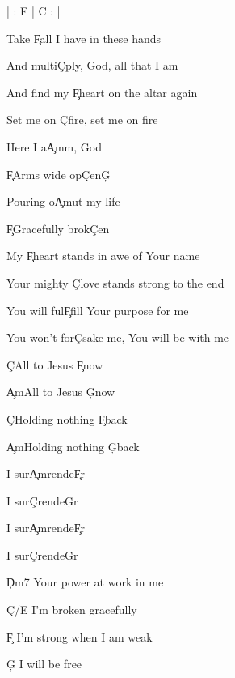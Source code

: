 \documentclass[9pt]{extarticle}
\begin{document}
\bsong

\bi
| : F | C : |
\ei

\bv[2]
Take \c{F}all I have in these hands

And multi\c{C}ply, God, all that I am

And find my \c{F}heart on the altar again

Set me on \c{C}fire, set me on fire
\ev

\bc
Here I a\c{Am}m, God

\c{F}Arms wide op\c{C}en\c{G}

Pouring o\c{Am}ut my life

\c{F}Gracefully brok\c{C}en
\ec

\bv
My \c{F}heart stands in awe of Your name

Your mighty \c{C}love stands strong to the end

You will ful\c{F}fill Your purpose for me

You won't for\c{C}sake me, You will be with me
\ev


\bb[2]
\c{C}All to Jesus \c{F}now

\c{Am}All to Jesus \c{G}now

\c{C}Holding nothing \c{F}back

\c{Am}Holding nothing \c{G}back
\eb

\bb[2]
I sur\c{Am}rende\c{F}r

I sur\c{C}rende\c{G}r

I sur\c{Am}rende\c{F}r

I sur\c{C}rende\c{G}r
\eb


\bb[2]
\c{Dm7} Your power at work in me

\c{C/E} I'm broken gracefully

\c{F} I'm strong when I am weak

\c{G} I will be free
\eb


\esong
\end{document}
